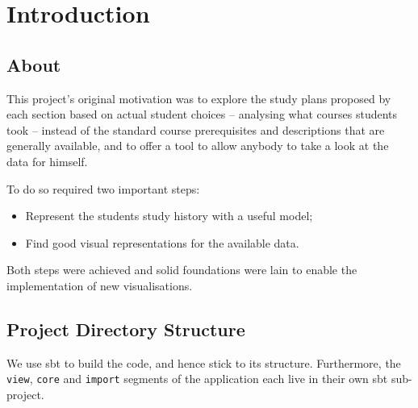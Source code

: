 
\usepackage{multirow}

\graphicspath{{images/}}





%

 \setcounter{page}{1}

\renewcommand{\contentsname}{Table of Contents}
\tableofcontents
\clearpage
\thispagestyle{empty}
\cleardoublepage

 \setcounter{page}{1}

\chapter{Introduction}
\section{About}
This project's original motivation was to explore the study plans proposed by each section based on actual student choices -- analysing what courses students took -- instead of the standard course prerequisites and descriptions that are generally available, and to offer a tool to allow anybody to take a look at the data for himself.

To do so required two important steps:
\begin{itemize}
\item Represent the students study history with a useful model;
\item Find good visual representations for the available data.
\end{itemize}

Both steps were achieved and solid foundations were lain to enable the implementation of new visualisations.

\newpage
\section{Project Directory Structure}
We use sbt to build the code, and hence stick to its structure. Furthermore, the \verb|view|, \verb|core| and \verb|import| segments of the application each live in their own sbt sub-project.

